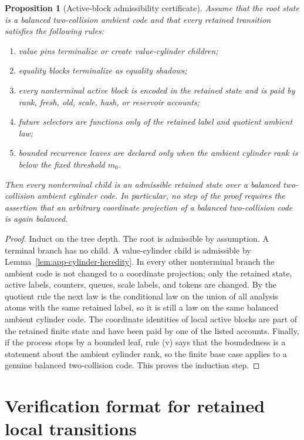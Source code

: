 \documentclass[11pt]{article}
\newtheorem{proposition}[theorem]{Proposition}
\theoremstyle{remark}
\begin{document}
\begin{proposition}[Active-block admissibility certificate]\label{prop:app-active-admissibility}
Assume that the root state is a balanced two-collision ambient code and that every retained transition satisfies the following rules:
\begin{enumerate}[label=\textup{(\roman*)}]
\item value pins terminalize or create value-cylinder children;
\item equality blocks terminalize as equality shadows;
\item every nonterminal active block is encoded in the retained state and is paid by rank, fresh, old, scale, hash, or reservoir accounts;
\item future selectors are functions only of the retained label and quotient ambient law;
\item bounded recurrence leaves are declared only when the ambient cylinder rank is below the fixed threshold $m_0$.
\end{enumerate}
Then every nonterminal child is an admissible retained state over a balanced two-collision ambient cylinder code.  In particular, no step of the proof requires the assertion that an arbitrary coordinate projection of a balanced two-collision code is again balanced.
\end{proposition}

\begin{proof}
Induct on the tree depth.  The root is admissible by assumption.  A terminal branch has no child.  A value-cylinder child is admissible by Lemma~\ref{lem:app-cylinder-heredity}.  In every other nonterminal branch the ambient code is not changed to a coordinate projection; only the retained state, active labels, counters, queues, scale labels, and tokens are changed.  By the quotient rule the next law is the conditional law on the union of all analysis atoms with the same retained label, so it is still a law on the same balanced ambient cylinder code.  The coordinate identities of local active blocks are part of the retained finite state and have been paid by one of the listed accounts.  Finally, if the process stops by a bounded leaf, rule (v) says that the boundedness is a statement about the ambient cylinder rank, so the finite base case applies to a genuine balanced two-collision code.  This proves the induction step.
\end{proof}

\section{Verification format for retained local transitions}\label{app:verification-format}
\end{document}
